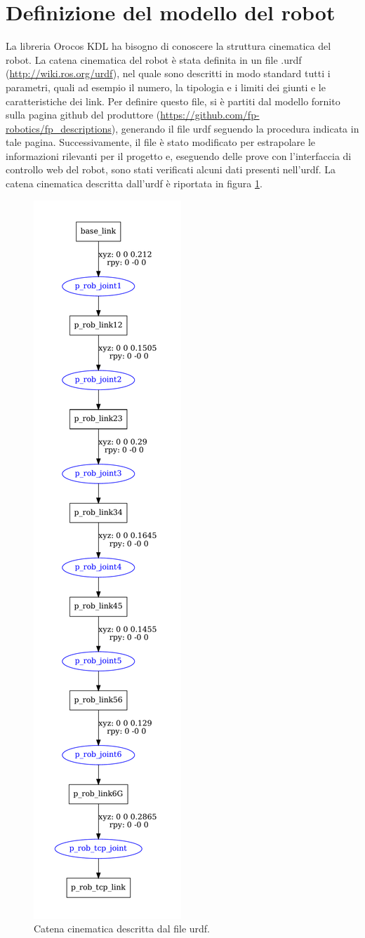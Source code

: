 \section{Definizione del modello del robot}
La libreria Orocos KDL ha bisogno di conoscere la struttura cinematica del robot. La catena cinematica del robot è stata definita in un file .urdf (\url{http://wiki.ros.org/urdf}), nel quale sono descritti in modo standard tutti i parametri, quali ad esempio il numero, la tipologia e i limiti dei giunti e le caratteristiche dei link. Per definire questo file, si è partiti dal modello fornito sulla pagina github del produttore (\url{https://github.com/fp-robotics/fp_descriptions}), generando il file urdf seguendo la procedura indicata in tale pagina. Successivamente, il file è stato modificato per estrapolare le informazioni rilevanti per il progetto e, eseguendo delle prove con l'interfaccia di controllo web del robot, sono stati verificati alcuni dati presenti nell'urdf. La catena cinematica descritta dall'urdf è riportata in figura \ref{fig:urdf_prob3}.
\begin{figure}[tbh]
	\centering
	\includegraphics[width=0.3\linewidth]{./OtherFiles/p_rob.pdf}
	\caption{Catena cinematica descritta dal file urdf.}
	\label{fig:urdf_prob3}
\end{figure}
